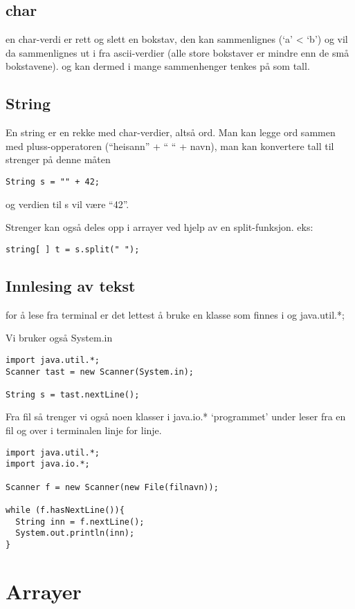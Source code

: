 \documentclass[a4paper,norsk,10pt]{article}
\begin{document}
\subsection{char}
\label{sec-3.1}


   en char-verdi er rett og slett en bokstav, den kan sammenlignes (`a' < `b') 
   og vil da sammenlignes ut
   i fra ascii-verdier (alle store bokstaver er mindre enn de små bokstavene).
   og kan dermed i mange sammenhenger tenkes på som tall.
\subsection{String}
\label{sec-3.2}


   En string er en rekke med char-verdier, altså ord. Man kan legge ord
   sammen med pluss-opperatoren 
   (``heisann'' + `` `` + navn), man kan konvertere tall til strenger på denne måten
\begin{verbatim}
String s = "" + 42;
\end{verbatim}
   og verdien til s vil være ``42''.

   Strenger kan også deles opp i arrayer ved hjelp av en split-funksjon. eks:
\begin{verbatim}
string[ ] t = s.split(" ");
\end{verbatim}
\subsection{Innlesing av tekst}
\label{sec-3.3}

for å lese fra terminal er det lettest å bruke en klasse som
finnes i og java.util.*;

Vi bruker også System.in

\begin{verbatim}
import java.util.*;
Scanner tast = new Scanner(System.in);

String s = tast.nextLine();
\end{verbatim}

Fra fil så trenger vi også noen klasser i java.io.*
`programmet' under leser fra en fil og over i terminalen linje for linje.

\begin{verbatim}
import java.util.*;
import java.io.*;

Scanner f = new Scanner(new File(filnavn));

while (f.hasNextLine()){
  String inn = f.nextLine();
  System.out.println(inn);
}
\end{verbatim}
\section{Arrayer}
\label{sec-4}
\end{document}
